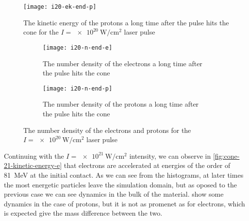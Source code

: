 \documentclass[12pt, class=report, crop=false]{standalone}
\begin{document}
\begin{figure}[h]
  \centering
  \texttt{[image: i20-ek-end-p]}
  \caption{The kinetic energy of the protons a long time after the pulse
  hits the cone for the \(I=\SI{e20}{\watt\per\centi\metre\squared}\)
  laser pulse}%
  \label{fig:cone-20-kinetic-energy-p}%
\end{figure}

\begin{figure}[h]
  \centering
  \begin{subfigure}[b]{0.475\textwidth}
    \centering
    \texttt{[image: i20-n-end-e]}
    \caption{The number density of the electrons a long time after the pulse
    hits the cone}%
  \end{subfigure}
  \hfill
  \begin{subfigure}[b]{0.475\textwidth}
    \centering
    \texttt{[image: i20-n-end-p]}
    \caption{The number density of the protons a long time after the pulse
    hits the cone}%
  \end{subfigure}
  \caption{The number density of the electrons and protons for the
  \(I=\SI{e20}{\watt\per\centi\metre\squared}\) laser pulse}%
  \label{fig:cone-20-number-density}%
\end{figure}

Continuing with the \(I=\SI{e21}{\watt\per\centi\metre\squared}\) intensity,
we can observe in \cref{fig:cone-21-kinetic-energy-e} that electrons are
accelerated at energies of the order of \SI{81}{\mega\eV} at the initial contact.
As we can see from the histograms, at later times the most energetic particles
leave the simulation domain, but as oposed to the previous case we can see
dynamics in the bulk of the material.  show
some dynamics in the case of protons, but it is not as promenet as for electrons,
which is expected give the mass difference between the two.
\end{document}

